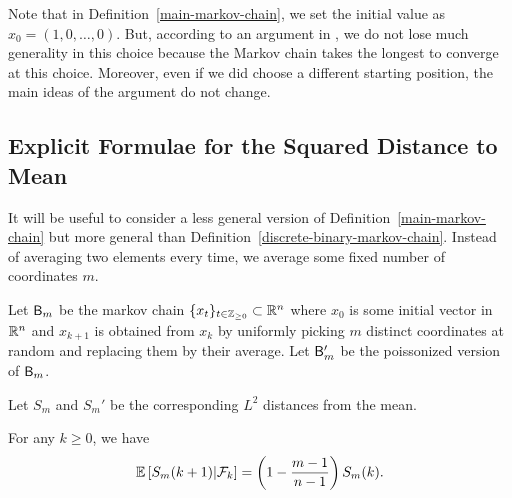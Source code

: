 \documentclass[12pt]{article}
\begin{document}
Note that in Definition~\ref{main-markov-chain}, we set the initial value as $x_0 = (1, 0, \ldots, 0)$. But, according to an argument in \cite{chatterjee2021phase}, we do not lose much generality in this choice because the Markov chain takes the longest to converge at this choice. Moreover, even if we did choose a different starting position, the main ideas of the argument do not change.

\subsection{Explicit Formulae for the Squared Distance to Mean} 

It will be useful to consider a less general version of Definition~\ref{main-markov-chain} but more general than Definition~\ref{discrete-binary-markov-chain}. Instead of averaging two elements every time, we average some fixed number of coordinates $m$. 

\begin{defn}
	Let $\mathsf{B}_m$ be the markov chain $\{x_t\}_{t \in \mathbb{Z}_{\geq 0} } \subset \mathbb{R}^n$ where $x_0$ is some initial vector in $\mathbb{R}^n$ and $x_{k+1}$ is obtained from $x_k$ by uniformly picking $m$ distinct coordinates at random and replacing them by their average. Let $\mathsf{B}_m'$ be the poissonized version of $\mathsf{B}_m$. 
\end{defn}

Let $S_m$ and $S_m'$ be the corresponding $L^2$ distances from the mean.

\begin{prop} \label{explicit-formula-1}
	For any $k \geq 0$, we have 
	\[
		\mathbb{E} \left [ S_m(k+1) | \mathcal{F}_k \right ] = \left ( 1 - \frac{m-1}{n-1} \right ) S_m(k).	
	\]
\end{prop}
\end{document}
